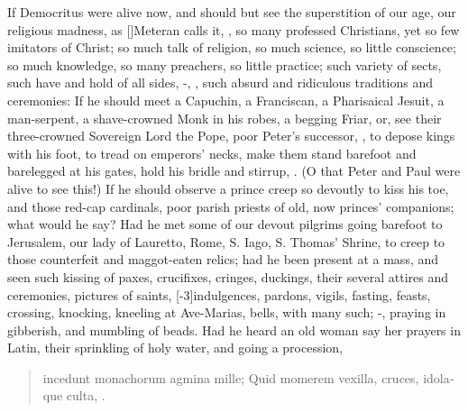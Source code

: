 {If Democritus were alive now, and should but see the superstition of
our age, our religious madness, as [\baselineskip]Meteran calls it,
, so many professed Christians, yet so few imitators
of Christ; so much talk of religion, so much science, so little
conscience; so much knowledge, so many preachers, so little practice;
such variety of sects, such have and hold of all sides, -, \etc{}, such absurd and ridiculous traditions and
ceremonies: If he should meet a  Capuchin, a Franciscan, a
Pharisaical Jesuit, a man-serpent, a shave-crowned Monk in his robes, a
begging Friar, or, see their three-crowned Sovereign Lord the Pope,
poor Peter's successor, , to depose kings with his
foot, to tread on emperors' necks, make them stand barefoot and
barelegged at his gates, hold his bridle and stirrup, \etc{}. (O that Peter
and Paul were alive to see this!) If he should observe a prince
creep so devoutly to kiss his toe, and those red-cap cardinals, poor
parish priests of old, now princes' companions; what would he say?
 Had he met some of our devout pilgrims
going barefoot to Jerusalem, our lady of Lauretto, Rome, S. Iago, S.
Thomas' Shrine, to creep to those counterfeit and maggot-eaten relics;
had he been present at a mass, and seen such kissing of paxes,
crucifixes, cringes, duckings, their several attires and ceremonies,
pictures of saints, [-3\baselineskip]indulgences, pardons, vigils, fasting, feasts,
crossing, knocking, kneeling at Ave-Marias, bells, with many such;
-, praying in gibberish, and mumbling
of beads. Had he heard an old woman say her prayers in Latin, their
sprinkling of holy water, and going a procession,

\begin{latin}
\begin{verse}%
incedunt monachorum agmina mille;
Quid momerem vexilla, cruces, idolaque culta, \etc{}.
\end{verse}%
\end{latin}
%

}
